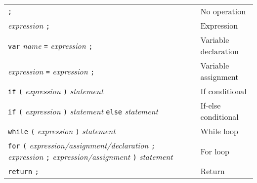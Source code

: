 \begin{table}[H]
    \begin{tabular}{ m{225pt} l }
        \verb|;|                                                                                                                                                                                                        & No operation         \\
        \textit{expression} \verb|;|                                                                                                                                                                                    & Expression           \\
        \verb|var| \textit{name} \verb|=| \textit{expression} \verb|;|                                                                                                                                                  & Variable declaration \\
        \textit{expression} \verb|=| \textit{expression} \verb|;|                                                                                                                                                       & Variable assignment  \\
        \verb|if| \verb|(| \textit{expression} \verb|)| \textit{statement}                                                                                                                                              & If conditional       \\
        \verb|if| \verb|(| \textit{expression} \verb|)| \textit{statement} \verb|else| \textit{statement}                                                                                                               & If-else conditional  \\
        \verb|while| \verb|(| \textit{expression} \verb|)| \textit{statement}                                                                                                                                           & While loop           \\
        \verb|for| \verb|(| \textit{expression/assignment/declaration} \verb|;| \newline \hspace*{29pt} \textit{expression} \verb|;| \textit{expression/assignment} \verb|)| \newline \hspace*{29pt} \textit{statement} & For loop             \\
        \verb|return| \verb|;|                                                                                                                                                                                          & Return               \\

\end{tabular}
\end{table}
